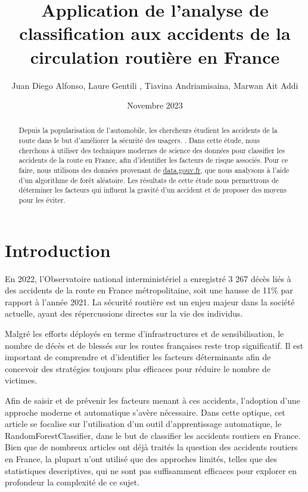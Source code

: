 \documentclass[french]{article}
\title{Application de l'analyse de classification aux accidents de la circulation routière en France}
\author{Juan Diego Alfonso, Laure Gentili , Tiavina Andriamisaina, Marwan Ait Addi}
\date{Novembre 2023}
\begin{document}
\maketitle

\begin{abstract}
Depuis la popularisation de l'automobile, les chercheurs étudient les accidents de la route dans le but d'améliorer la sécurité des usagers. \cite{rapport-accident-canada}. Dans cette étude, nous cherchons à utiliser des techniques modernes de science des données pour classifier les accidents de la route en France, afin d’identifier les facteurs de risque associés. Pour ce faire, nous utilisons des données provenant de \href{http://data.gouv.fr/}{data.gouv.fr}, que nous analysons à l'aide d’un algorithme de forêt aléatoire. Les résultats de cette étude nous permettrons de déterminer les facteurs qui influent la gravité d’un accident et de proposer des moyens pour les éviter.
\end{abstract}

\tableofcontents 

\section{Introduction}
En 2022, l’Observatoire national interministériel a enregistré 3 267 décès liés à des accidents de la route en France métropolitaine, soit une hausse de 11\% par rapport à l’année 2021. La sécurité routière est un enjeu majeur dans la société actuelle, ayant des répercussions directes sur la vie des individus.

Malgré les efforts déployés en terme d’infrastructures et de sensibilisation, le nombre de décès et de blessés sur les routes françaises reste trop significatif. Il est important de comprendre et d’identifier les facteurs déterminants afin de concevoir des stratégies toujours plus efficaces pour réduire le nombre de victimes. 

Afin de saisir et de prévenir les facteurs menant à ces accidents, l’adoption d’une approche moderne et automatique s’avère nécessaire. Dans cette optique, cet article se focalise sur l’utilisation d’un outil d’apprentissage automatique, le RandomForestClassifier, dans le but de classifier les accidents routiers en France. Bien que de nombreux articles ont déjà traités la question des accidents routiers en France, la plupart n’ont utilisé que des approches limités, telles que des statistiques descriptives, qui ne sont pas suffisamment efficaces pour explorer en profondeur la complexité de ce sujet.
\end{document}
